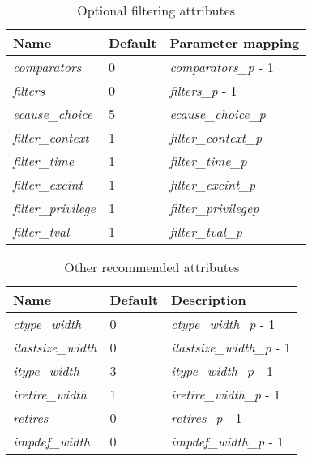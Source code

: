 \begin{table}[!h]
    \centering
    \caption{Optional filtering attributes}
    \label{tab:optionalAttributes}
    \begin{tabulary}{\textwidth}{|l|l|p{80mm}|}
        \hline
        \textbf{Name} & \textbf{Default} & \textbf{Parameter mapping} \\
        \hline
         \textit{comparators} & 0 & \textit{comparators\_p} - 1\\
        \hline
        \textit{filters} & 0 & \textit{filters\_p} - 1\\
        \hline
        \textit{ecause\_choice} & 5 & \textit{ecause\_choice\_p}\\
        \hline
        \textit{filter\_context} & 1 & \textit{filter\_context\_p}\\
        \hline
        \textit{filter\_time} & 1 & \textit{filter\_time\_p}\\
        \hline
        \textit{filter\_excint} & 1 & \textit{filter\_excint\_p}\\
        \hline
        \textit{filter\_privilege} & 1 & \textit{filter\_privilege\-p}\\
        \hline
        \textit{filter\_tval} & 1 & \textit{filter\_tval\_p}\\
        \hline
    \end{tabulary}
\end{table}

\begin{table}[!h]
    \centering
    \caption{Other recommended attributes}
    \label{tab:otherAttributes}
    \begin{tabulary}{\textwidth}{|l|l|p{80mm}|}
        \hline
        \textbf{Name} & \textbf{Default} & \textbf{Description} \\
        \hline
        \textit{ctype\_width} & 0 & \textit{ctype\_width\_p} - 1\\
        \hline
        \textit{ilastsize\_width} & 0 & \textit{ilastsize\_width\_p} - 1\\
        \hline
        \textit{itype\_width} & 3 & \textit{itype\_width\_p} - 1\\
        \hline
        \textit{iretire\_width} & 1 & \textit{iretire\_width\_p} - 1\\
        \hline
        \textit{retires} & 0 & \textit{retires\_p} - 1\\
        \hline
        \textit{impdef\_width} & 0 & \textit{impdef\_width\_p} - 1\\
        \hline
    \end{tabulary}
\end{table}

